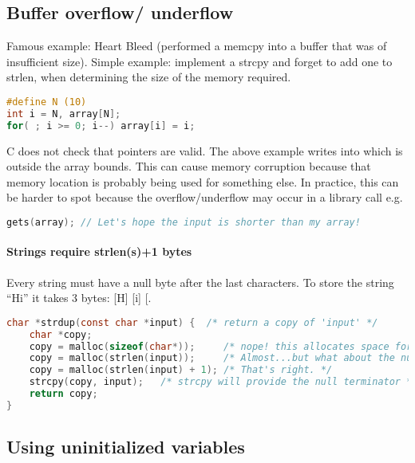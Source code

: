 \subsection{Buffer overflow/ underflow}\label{buffer-overflow-underflow}

Famous example: Heart Bleed (performed a memcpy into a buffer that was of insufficient size). Simple example: implement a strcpy and forget to add one to strlen, when determining the size of the memory required.

\begin{lstlisting}[language=C]
#define N (10)
int i = N, array[N];
for( ; i >= 0; i--) array[i] = i;
\end{lstlisting}

C does not check that pointers are valid. The above example writes into
 which is outside the array bounds. This can cause
memory corruption because that memory location is probably being used
for something else. In practice, this can be harder to spot because the
overflow/underflow may occur in a library call e.g.

\begin{lstlisting}[language=C]
gets(array); // Let's hope the input is shorter than my array!
\end{lstlisting}


\paragraph{Strings require strlen(s)+1 bytes}

Every string must have a null byte after the last characters. To store
the string ``Hi'' it takes 3 bytes: {[}H{]} {[}i{]} {[}\0{]}.

\begin{lstlisting}[language=C]
  char *strdup(const char *input) {  /* return a copy of 'input' */
    char *copy;
    copy = malloc(sizeof(char*));     /* nope! this allocates space for a pointer, not a string */
    copy = malloc(strlen(input));     /* Almost...but what about the null terminator? */
    copy = malloc(strlen(input) + 1); /* That's right. */
    strcpy(copy, input);   /* strcpy will provide the null terminator */
    return copy;
}
\end{lstlisting}

\subsection{Using uninitialized
variables}\label{using-uninitialized-variables}

